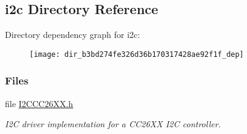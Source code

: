 \subsection{i2c Directory Reference}
\label{dir_b3bd274fe326d36b170317428ae92f1f}
Directory dependency graph for i2c\+:
\nopagebreak
\begin{figure}[H]
\begin{center}
\leavevmode
\texttt{[image: dir\_b3bd274fe326d36b170317428ae92f1f\_dep]}
\end{center}
\end{figure}
\subsubsection*{Files}
\begin{DoxyCompactItemize}
\item 
file \hyperlink{_i2_c_c_c26_x_x_8h}{I2\+C\+C\+C26\+X\+X.\+h}
\begin{DoxyCompactList}\small\item\em I2\+C driver implementation for a C\+C26\+X\+X I2\+C controller. \end{DoxyCompactList}\end{DoxyCompactItemize}

